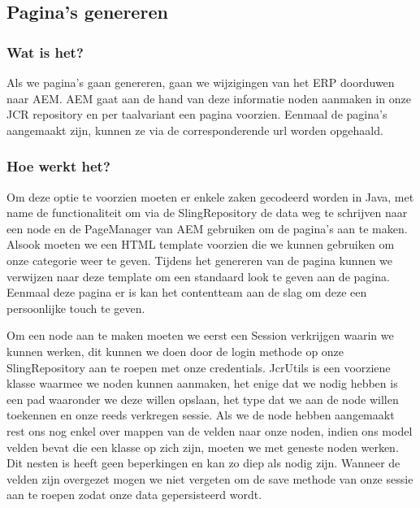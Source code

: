 \documentclass{article}
\begin{document}
	\subsection{Pagina's genereren} 
	\subsubsection{Wat is het?}
	Als we pagina's gaan genereren, gaan we wijzigingen van het ERP doorduwen naar AEM. AEM gaat aan de hand van deze informatie noden aanmaken in onze JCR repository en per taalvariant een pagina voorzien. Eenmaal de pagina's aangemaakt zijn, kunnen ze via de corresponderende url worden opgehaald.
	\subsubsection{Hoe werkt het?}
	Om deze optie te voorzien moeten er enkele zaken gecodeerd worden in Java, met name de functionaliteit om via de SlingRepository de data weg te schrijven naar een node en de PageManager van AEM gebruiken om de pagina's aan te maken. Alsook moeten we een HTML template voorzien die we kunnen gebruiken om onze categorie weer te geven. Tijdens het genereren van de pagina kunnen we verwijzen naar deze template om een standaard look te geven aan de pagina. Eenmaal deze pagina er is kan het contentteam aan de slag om deze een persoonlijke touch te geven.
	\par
	Om een node aan te maken moeten we eerst een Session verkrijgen waarin we kunnen werken, dit kunnen we doen door de login methode op onze SlingRepository aan te roepen met onze credentials. JcrUtils is een voorziene klasse waarmee we noden kunnen aanmaken, het enige dat we nodig hebben is een pad waaronder we deze willen opslaan, het type dat we aan de node willen toekennen en onze reeds verkregen sessie. Als we de node hebben aangemaakt rest ons nog enkel over mappen van de velden naar onze noden, indien ons model velden bevat die een klasse op zich zijn, moeten we met geneste noden werken. Dit nesten is heeft geen beperkingen en kan zo diep als nodig zijn. Wanneer de velden zijn overgezet mogen we niet vergeten om de save methode van onze sessie aan te roepen zodat onze data gepersisteerd wordt.
	\par
\end{document}
